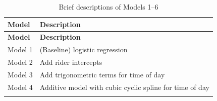 \documentclass[12pt,twoside]{reedthesis}
\begin{document}
  \begin{longtable}[]{@{}ll@{}}
  \caption{Brief descriptions of Models 1--6
  \label{tab:models}}\tabularnewline
  \toprule
  \begin{minipage}[b]{0.13\columnwidth}\raggedright\strut
  \textbf{Model}
  \strut\end{minipage} &
  \begin{minipage}[b]{0.72\columnwidth}\raggedright\strut
  \textbf{Description}
  \strut\end{minipage}\tabularnewline
  \midrule
  \endfirsthead
  \toprule
  \begin{minipage}[b]{0.13\columnwidth}\raggedright\strut
  \textbf{Model}
  \strut\end{minipage} &
  \begin{minipage}[b]{0.72\columnwidth}\raggedright\strut
  \textbf{Description}
  \strut\end{minipage}\tabularnewline
  \midrule
  \endhead
  \begin{minipage}[t]{0.13\columnwidth}\raggedright\strut
  Model 1
  \strut\end{minipage} &
  \begin{minipage}[t]{0.72\columnwidth}\raggedright\strut
  (Baseline) logistic regression
  \strut\end{minipage}\tabularnewline
  \begin{minipage}[t]{0.13\columnwidth}\raggedright\strut
  Model 2
  \strut\end{minipage} &
  \begin{minipage}[t]{0.72\columnwidth}\raggedright\strut
  Add rider intercepts
  \strut\end{minipage}\tabularnewline
  \begin{minipage}[t]{0.13\columnwidth}\raggedright\strut
  Model 3
  \strut\end{minipage} &
  \begin{minipage}[t]{0.72\columnwidth}\raggedright\strut
  Add trigonometric terms for time of day
  \strut\end{minipage}\tabularnewline
  \begin{minipage}[t]{0.13\columnwidth}\raggedright\strut
  Model 4
  \strut\end{minipage} &
  \begin{minipage}[t]{0.72\columnwidth}\raggedright\strut
  Additive model with cubic cyclic spline for time of day
  \strut\end{minipage}\tabularnewline
  \begin{minipage}[t]{0.13\columnwidth}\raggedright\strut

\end{minipage}
\end{longtable}
\end{document}
